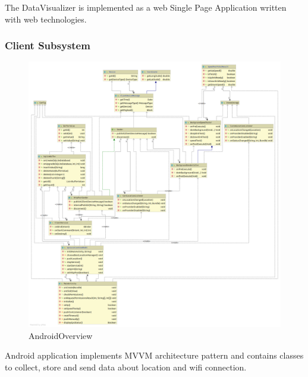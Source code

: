 The DataVisualizer is implemented as a web Single Page Application
written with web technologies.

\hypertarget{client-subsystem}{%
\subsubsection{Client Subsystem}\label{client-subsystem}}

\begin{figure}
\centering
\includegraphics{schemes/classes/android/class.png}
\caption{AndroidOverview}
\end{figure}

Android application implements MVVM architecture pattern and contains
classes to collect, store and send data about location and wifi
connection.

